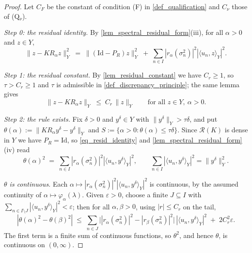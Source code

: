 \documentclass[a4paper]{report}
\theoremstyle{plain}
\theoremstyle{definition}
\theoremstyle{remark}
\newcommand{\Ran}{\mathcal{R}}
\newcommand{\Id}{\mathrm{Id}}
\begin{document}
\begin{proof}
  Let $C_F$ be the constant of condition (F) in \cref{def_qualification} and $C_{\nu}$
  those of (Q$_{\nu}$).

  \emph{Step 0: the residual identity.}  By \cref{lem_spectral_residual_form}(iii),
  for all $\alpha > 0$ and $z \in Y$,
  \begin{equation}\label{eq_resid_identity}
    \|z - KR_{\alpha}z\|_Y^{2} \;=\; \|(\Id-P_R)z\|_Y^{2}
      \;+\; \sum_{n \in I} |r_{\alpha}(\sigma_n^{2})|^{2}|\langle u_n,z\rangle_Y|^{2} .
  \end{equation}

  \emph{Step 1: the residual constant.}  By \cref{lem_residual_constant} we have
  $C_r \ge 1$, so $\tau > C_r \ge 1$ and $\tau$ is admissible in
  \cref{def_discrepancy_principle}; the same lemma gives
  \begin{equation}\label{eq_resid_uniform}
    \|z - KR_{\alpha}z\|_Y \;\le\; C_r\,\|z\|_Y \qquad
      \text{for all } z \in Y,\ \alpha > 0 .
  \end{equation}

  \emph{Step 2: the rule exists.}  Fix $\delta > 0$ and $y^{\delta} \in Y$ with
  $\|y^{\delta}\|_Y > \tau\delta$, and put $\theta(\alpha) := \|KR_{\alpha}y^{\delta} -
  y^{\delta}\|_Y$ and $S := \{\alpha > 0 : \theta(\alpha) \le \tau\delta\}$.  Since
  $\Ran(K)$ is dense in $Y$ we have $P_R = \Id$, so \eqref{eq_resid_identity} and
  \cref{lem_spectral_residual_form}(iv) read
  \begin{equation}\label{eq_theta_series}
    \theta(\alpha)^{2} \;=\; \sum_{n \in I} |r_{\alpha}(\sigma_n^{2})|^{2}
      |\langle u_n, y^{\delta}\rangle_Y|^{2},
    \qquad \sum_{n \in I}|\langle u_n,y^{\delta}\rangle_Y|^{2} = \|y^{\delta}\|_Y^{2} .
  \end{equation}

  \emph{$\theta$ is continuous.}  Each $\alpha \mapsto |r_{\alpha}(\sigma_n^{2})|^{2}
  |\langle u_n,y^{\delta}\rangle_Y|^{2}$ is continuous, by the assumed continuity of
  $\alpha \mapsto \varphi_{\alpha}(\lambda)$.  Given $\varepsilon > 0$, choose a finite
  $J \subseteq I$ with $\sum_{n \in I\setminus J}|\langle u_n,y^{\delta}\rangle_Y|^{2} <
  \varepsilon$; then for all $\alpha,\beta > 0$, using $|r| \le C_r$ on the tail,
  \[
    |\theta(\alpha)^{2} - \theta(\beta)^{2}| \;\le\;
      \sum_{n \in J}\bigl||r_{\alpha}(\sigma_n^{2})|^{2}
        - |r_{\beta}(\sigma_n^{2})|^{2}\bigr|\,|\langle u_n,y^{\delta}\rangle_Y|^{2}
      \;+\; 2C_r^{2}\varepsilon .
  \]
  The first term is a finite sum of continuous functions, so $\theta^{2}$, and hence
  $\theta$, is continuous on $(0,\infty)$.


\end{proof}
\end{document}
